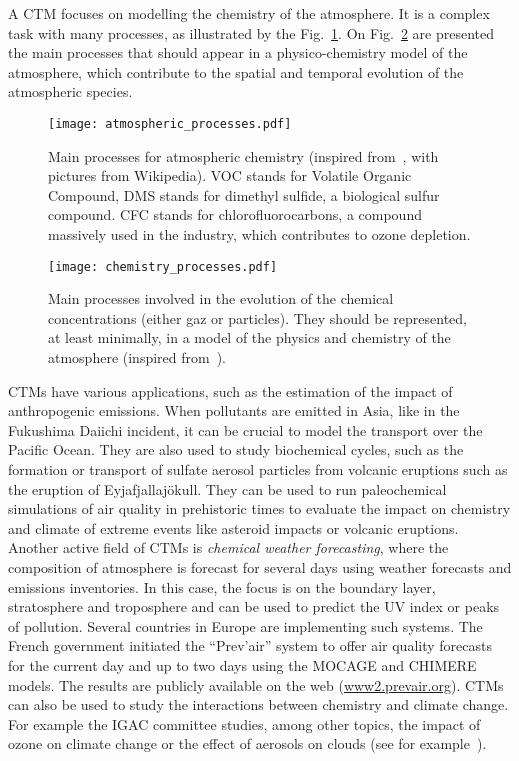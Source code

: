 A CTM focuses on modelling the chemistry of the atmosphere. It is a complex task
with many processes, as illustrated by the Fig.~\ref{fig:atmospheric_proc}. On
Fig.~\ref{fig:chem_processes} are presented the main processes that should
appear in a physico-chemistry model of the atmosphere, which contribute to the
spatial and temporal evolution of the atmospheric species.
\begin{figure}
  \centering
  \texttt{[image: atmospheric\_processes.pdf]}
  \caption{Main processes for atmospheric chemistry (inspired from~\cite{Delmas2005},
  with pictures from Wikipedia). VOC stands for Volatile
    Organic Compound, DMS stands for dimethyl sulfide, a biological sulfur
    compound. CFC stands for chlorofluorocarbons, a compound massively used in the
  industry, which contributes to ozone depletion. }\label{fig:atmospheric_proc}
\end{figure}
\begin{figure}
  \centering
  \texttt{[image: chemistry\_processes.pdf]}
  \caption{Main processes involved in the evolution of the chemical
    concentrations (either gaz or particles). They should be represented, at
    least minimally, in a model of the physics and chemistry of the atmosphere
    (inspired from~\cite{Delmas2005}). }
\label{fig:chem_processes}
\end{figure}
CTMs have various applications, such as the estimation of the impact of
anthropogenic emissions. When pollutants are emitted in Asia, like in the
Fukushima Daiichi incident, it can be crucial to model the transport over the
Pacific Ocean. They are also used to study biochemical cycles, such as the
formation or transport of sulfate aerosol particles from volcanic eruptions such
as the eruption of Eyjafjallaj\"okull. They can be used to run paleochemical
simulations of air quality in prehistoric times to evaluate the impact on
chemistry and climate of extreme events like asteroid impacts or volcanic
eruptions. Another active field of CTMs is \textit{chemical weather
forecasting},
where the composition of atmosphere is forecast for several days using weather
forecasts and emissions inventories. In this case, the focus is on the
boundary layer, \gls{stratosphere} and \gls{troposphere} and can be used to
predict the UV index or peaks of pollution. Several countries in Europe are
implementing such systems.  The French government initiated the ``Prev'air''
system to offer air quality forecasts for the current day and up to two days
using the MOCAGE and CHIMERE models.  The results are publicly available on the
web (\url{www2.prevair.org}).  CTMs can also be used to study the interactions
between chemistry and climate change.  For example the IGAC committee studies,
among other topics, the impact of ozone on climate change or the effect of
aerosols on clouds (see for example~\cite{IGAC2006}).

